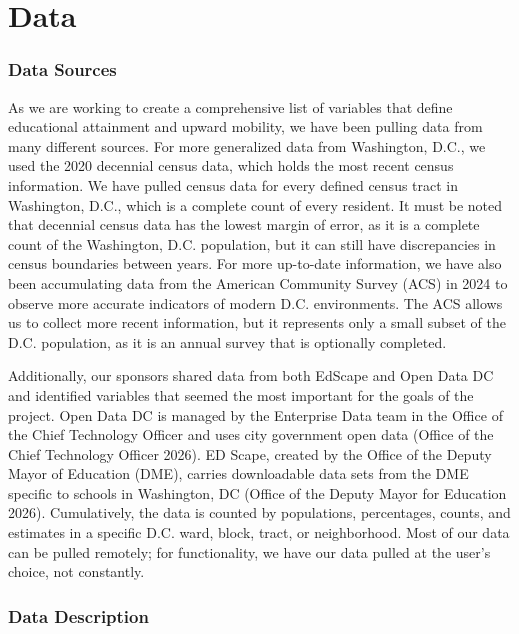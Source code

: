 \documentclass[
  letterpaper,
  DIV=11,
  numbers=noendperiod]{scrartcl}
\begin{document}
\section{Data}\label{sec-data}

\subsubsection{Data Sources}\label{data-sources}

As we are working to create a comprehensive list of variables that
define educational attainment and upward mobility, we have been pulling
data from many different sources. For more generalized data from
Washington, D.C., we used the 2020 decennial census data, which holds
the most recent census information. We have pulled census data for every
defined census tract in Washington, D.C., which is a complete count of
every resident. It must be noted that decennial census data has the
lowest margin of error, as it is a complete count of the Washington,
D.C. population, but it can still have discrepancies in census
boundaries between years. For more up-to-date information, we have also
been accumulating data from the American Community Survey (ACS) in 2024
to observe more accurate indicators of modern D.C. environments. The ACS
allows us to collect more recent information, but it represents only a
small subset of the D.C. population, as it is an annual survey that is
optionally completed.

Additionally, our sponsors shared data from both EdScape and Open Data
DC and identified variables that seemed the most important for the goals
of the project. Open Data DC is managed by the Enterprise Data team in
the Office of the Chief Technology Officer and uses city government open
data (Office of the Chief Technology Officer 2026). ED Scape, created by
the Office of the Deputy Mayor of Education (DME), carries downloadable
data sets from the DME specific to schools in Washington, DC (Office of
the Deputy Mayor for Education 2026). Cumulatively, the data is counted
by populations, percentages, counts, and estimates in a specific D.C.
ward, block, tract, or neighborhood. Most of our data can be pulled
remotely; for functionality, we have our data pulled at the user's
choice, not constantly.

\subsubsection{Data Description}\label{data-description}
\end{document}
